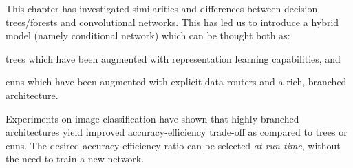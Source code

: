 \documentclass[thesis]{subfiles}
\begin{document}
This chapter has investigated similarities and differences between decision trees/forests and convolutional networks. This has led us to introduce a hybrid model (namely conditional network) which can be thought both as: 
\begin{enumerate*}[label= (\textbf{\roman*})]
\item trees which have been augmented with representation learning capabilities, and
\item \glspl{cnn} which have been augmented with explicit data routers and a rich, branched architecture.
\end{enumerate*}
Experiments on image classification have shown that highly branched architectures yield improved accuracy-efficiency trade-off as compared to trees or \glspl{cnn}. The desired accuracy-efficiency ratio can be selected \emph{at run time}, without the need to train a new network.
	
\end{document}
